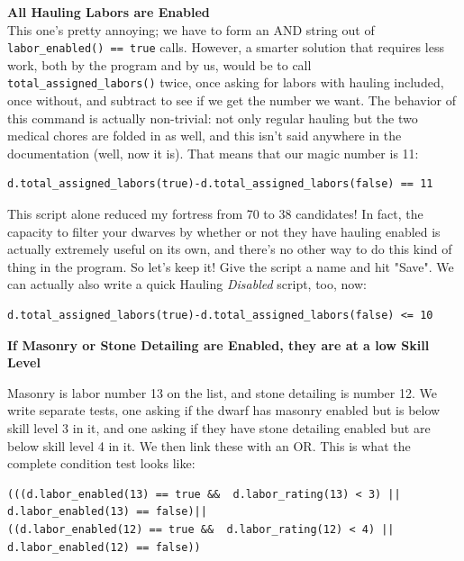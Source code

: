 \documentclass[]{article}
\begin{document}
\textbf{All Hauling Labors are Enabled}\\
This one's pretty annoying; we have to form an AND string out of \texttt{labor\_enabled() == true}
calls. However, a smarter solution that requires less work, both by the program and by us, would be to
call\\\texttt{total\_assigned\_labors()} twice, once asking for labors with hauling included, once
without, and subtract to see if we get the number we want. The behavior of this command is actually
non-trivial: not only regular hauling but the two medical chores are folded in as well, and this isn't
said anywhere in the documentation (well, now it is). That means that our magic number is 11:

\begin{verbatim}
d.total_assigned_labors(true)-d.total_assigned_labors(false) == 11
\end{verbatim}

%

This script alone reduced my fortress from 70 to 38 candidates! In fact, the capacity to filter your
dwarves by whether or not they have hauling enabled is actually extremely useful on its own, and there's
no other way to do this kind of thing in the program. So let's keep it! Give the script a name and hit
"Save". We can actually also write a quick Hauling \emph{Disabled} script, too, now:
\begin{verbatim}
d.total_assigned_labors(true)-d.total_assigned_labors(false) <= 10
\end{verbatim}

\textbf{If Masonry or Stone Detailing are Enabled, they are at a low Skill Level}

Masonry is labor number 13 on the list, and stone detailing is number 12. We write separate tests, one
asking if the dwarf has masonry enabled but is below skill level 3 in it, and one asking if they have
stone detailing enabled but are below skill level 4 in it. We then link these with an OR. This is what
the complete condition test looks like:
\begin{verbatim}
(((d.labor_enabled(13) == true &&  d.labor_rating(13) < 3) ||
d.labor_enabled(13) == false)|| 
((d.labor_enabled(12) == true &&  d.labor_rating(12) < 4) ||
d.labor_enabled(12) == false))
\end{verbatim}
\end{document}
